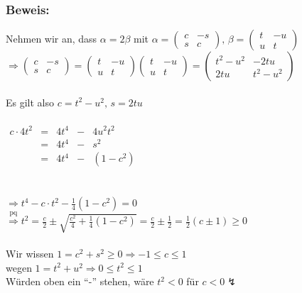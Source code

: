  \subsubsection{Beweis:}
 Nehmen wir an, dass $\alpha = 2 \beta$ mit $\alpha = \begin{pmatrix} c & -s \\ s & c \end{pmatrix}, \, \beta = \begin{pmatrix} t & -u \\ u & t \end{pmatrix}$\\
 $\Rightarrow \begin{pmatrix} c & -s \\ s & c \end{pmatrix} = \begin{pmatrix} t & -u \\ u & t \end{pmatrix} \begin{pmatrix} t & -u \\ u & t \end{pmatrix} = \begin{pmatrix} t^{2}-u^{2} & -2tu \\ 2tu & t^{2}-u^{2} \end{pmatrix}$\\
 \qquad\\
 Es gilt also $c=t^{2}-u^{2}, \, s=2tu$\\ 
 \qquad\\
$
\begin{array}{rcrcr}
c \cdot 4t^{2} &=& 4t^{4} &-& 4u^{2}t^{2}\\
 &=& 4t^{4} &-&  s^{2}\\
 &=& 4t^{4} &-& (1-c^{2})
\end{array} 
$\\
\qquad\\
\qquad\\
$ \Rightarrow t^{4} - c\cdot t^{2} - \frac{1}{4}(1-c^{2})=0$\\
$\mathop{\Rightarrow}\limits^{\text{pq}}t^{2} = \frac{c}{2} \pm \sqrt{\frac{c^{2}}{4}+\frac{1}{4}(1-c^{2})} = \frac{c}{2} \pm \frac{1}{2}=\frac{1}{2}(c\pm 1) \geq 0$\\
\qquad\\
Wir wissen $1=c^{2}+s^{2}\geq 0 \Rightarrow  -1 \leq c \leq 1$\\
wegen $1=t^{2}+u^{2}\Rightarrow 0 \leq t^{2}\leq 1$\\
Würden oben ein "`-"' stehen, wäre $t^{2} < 0$ für $c<0 \lightning$\\
